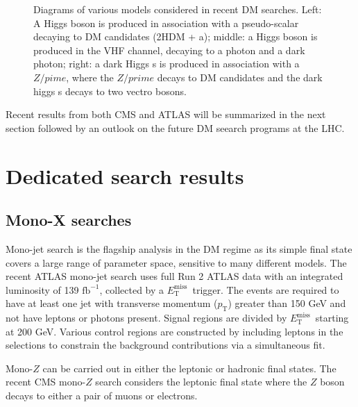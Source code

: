 \documentclass{moriond}
\def\et{E_\textrm{T}^{\textrm{miss}}}
\def\pt{{p_{\textrm{T}}}}
\begin{document}
\begin{figure} [htb]
\begin{minipage}{0.32\linewidth}
\end{minipage}
\caption[]{Diagrams of various models considered in recent DM searches. Left: A Higgs boson is produced in association with a pseudo-scalar decaying to DM candidates (2HDM + a); middle: a Higgs boson is produced in the VHF channel, decaying to a photon and a dark photon; right: a dark Higgs s is produced in association with a $Z/pime$, where the $Z/prime$ decays to DM candidates and the dark higgs s decays to two vectro bosons.}
\label{fig:diagrams}
\end{figure}

Recent results from both CMS and ATLAS will be summarized in the next section
followed by an outlook on the future DM seearch programs at the LHC.

\section{Dedicated search results}

\subsection{Mono-X searches}

Mono-jet search is the flagship analysis in the DM regime as its simple final
state covers a large range of parameter space, sensitive to many different
models. The recent ATLAS mono-jet search uses full Run 2 ATLAS data with an
integrated luminosity of 139 $\textrm{fb}^{-1}$, collected by a $\et$\ trigger.
The events are required to have at least one jet with transverse momentum
($\pt$) greater than 150 GeV and not have leptons or photons present. Signal
regions are divided by $\et$\ starting at 200 GeV. Various control regions are
constructed by including leptons in the selections to constrain the background
contributions via a simultaneous fit. 

Mono-$Z$ can be carried out in either the leptonic or hadronic final states.
The recent CMS mono-$Z$ search considers the leptonic final state where the $Z$
boson decays to either a pair of muons or electrons.  
\end{document}
